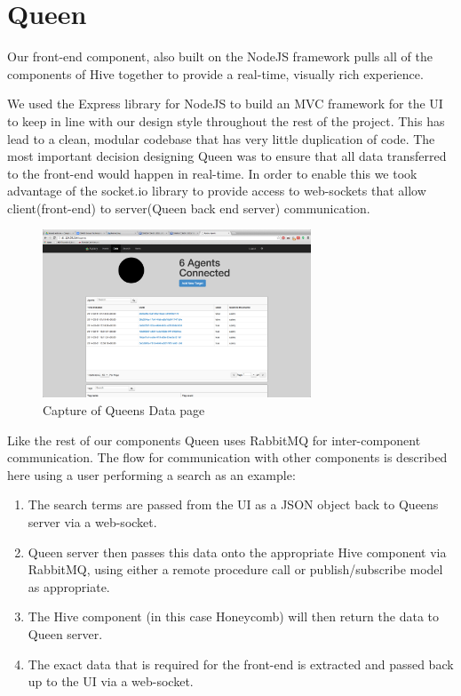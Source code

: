 \section{Queen}

Our front-end component, also built on the NodeJS framework pulls all of the
components of Hive together to provide a real-time, visually rich experience.

We used the Express\cite{express} library for NodeJS to build an MVC framework for the UI to
keep in line with our design style throughout the rest of the project. This has
lead to a clean, modular codebase that has very little duplication of code.
The most important decision designing Queen was to ensure that all data
transferred to the front-end would happen in real-time. In order to enable this
we took advantage of the socket.io\cite{socket} library to provide access to web-sockets that allow
client(front-end) to server(Queen back end server) communication.

\graphicspath{{./pics/}}
\begin{figure}[h!]
  \includegraphics[width=8cm, keepaspectratio]{data.png}
  \caption{Capture of Queens Data page}
\end{figure}

Like the rest of our components Queen uses RabbitMQ for inter-component
communication. The flow for communication with other components is described here
using a user performing a search as an example:

\begin{enumerate}
  \item The search terms are passed from the UI as a JSON object back to Queens
  server via a web-socket.
  \item Queen server then passes this data onto the appropriate Hive component
  via RabbitMQ, using either a remote procedure call or publish/subscribe model
  as appropriate.
  \item The Hive component (in this case Honeycomb) will then return the data to
  Queen server.
  \item The exact data that is required for the front-end is extracted and
  passed back up to the UI via a web-socket.
\end{enumerate}

